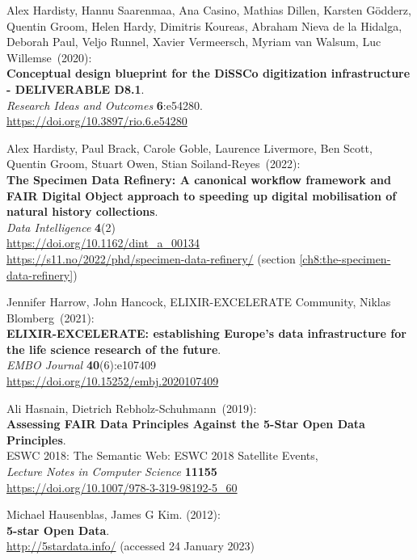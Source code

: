 \begin{thebibliography}{9}
Alex Hardisty, Hannu Saarenmaa, Ana Casino, Mathias Dillen, Karsten Gödderz, Quentin Groom, Helen Hardy, Dimitris Koureas, Abraham Nieva de la Hidalga, Deborah Paul, Veljo Runnel, Xavier Vermeersch, Myriam van Walsum, Luc Willemse~(2020):\\
\textbf{Conceptual design blueprint for the DiSSCo
digitization infrastructure - DELIVERABLE D8.1}.\\ 
\emph{Research Ideas and Outcomes} \textbf{6}:e54280.\\
\url{https://doi.org/10.3897/rio.6.e54280}

Alex Hardisty, Paul Brack, Carole Goble, Laurence
Livermore, Ben Scott, Quentin Groom, Stuart Owen, Stian Soiland-Reyes~(2022):\\
\textbf{The Specimen Data Refinery: A
canonical workflow framework and FAIR Digital Object approach to
speeding up digital mobilisation of natural history collections}.\\
\emph{Data Intelligence} \textbf{4}(2)\\
\url{https://doi.org/10.1162/dint_a_00134}\\
\url{https://s11.no/2022/phd/specimen-data-refinery/}
(section \vref{ch8:the-specimen-data-refinery})

Jennifer Harrow, John Hancock, ELIXIR-EXCELERATE Community,
Niklas Blomberg~(2021):\\
\textbf{ELIXIR-EXCELERATE: establishing Europe's data
infrastructure for the life science research of the future}.\\
\emph{EMBO Journal} \textbf{40}(6):e107409\\
\url{https://doi.org/10.15252/embj.2020107409}

Ali Hasnain, Dietrich Rebholz-Schuhmann~(2019):\\
\textbf{Assessing FAIR Data Principles Against the 5-Star Open Data
Principles}.\\
ESWC 2018: The Semantic Web: ESWC 2018 Satellite Events,\\
\emph{Lecture Notes in Computer Science} \textbf{11155}\\
\url{https://doi.org/10.1007/978-3-319-98192-5_60}

Michael Hausenblas, James G Kim. (2012): \\
\textbf{5-star {Open Data}}. \\
\url{http://5stardata.info/} (accessed 24 January 2023)


\end{thebibliography}
